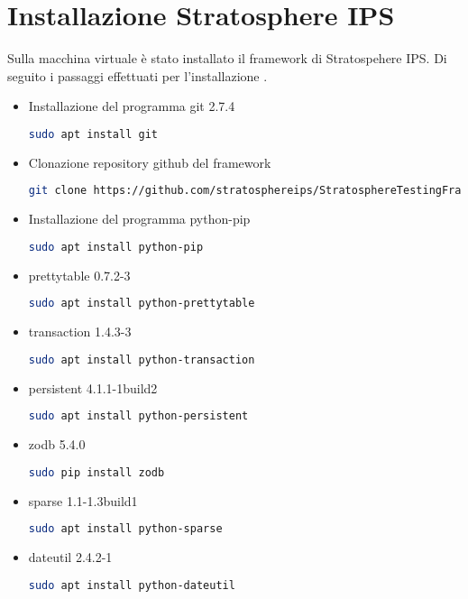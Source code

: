 \documentclass[../main.tex]{subfiles}
\begin{document}
\section{Installazione Stratosphere IPS}
Sulla macchina virtuale è stato installato il framework di Stratospehere IPS. Di seguito i passaggi effettuati per l'installazione \cite{stf}.
\begin{itemize}
				\item Installazione del programma git 2.7.4
\begin{lstlisting}[language=bash]
 sudo apt install git
\end{lstlisting}
				\item Clonazione repository github del framework
\begin{lstlisting}[language=bash]
 git clone https://github.com/stratosphereips/StratosphereTestingFramework
\end{lstlisting}
				\item Installazione del programma python-pip
\begin{lstlisting}[language=bash]
 sudo apt install python-pip
\end{lstlisting}
\end{itemize}
\begin{itemize}
				\item prettytable 0.7.2-3
\begin{lstlisting}[language=bash]
 sudo apt install python-prettytable
\end{lstlisting}
				\item transaction 1.4.3-3
\begin{lstlisting}[language=bash]
 sudo apt install python-transaction
\end{lstlisting}
				\item persistent 4.1.1-1build2
\begin{lstlisting}[language=bash]
 sudo apt install python-persistent
\end{lstlisting}
				\item zodb 5.4.0
\begin{lstlisting}[language=bash]
 sudo pip install zodb
\end{lstlisting}
				\item sparse 1.1-1.3build1
\begin{lstlisting}[language=bash]
 sudo apt install python-sparse
\end{lstlisting}
				\item dateutil 2.4.2-1
\begin{lstlisting}[language=bash]
 sudo apt install python-dateutil
\end{lstlisting}


\end{itemize}
\end{document}
